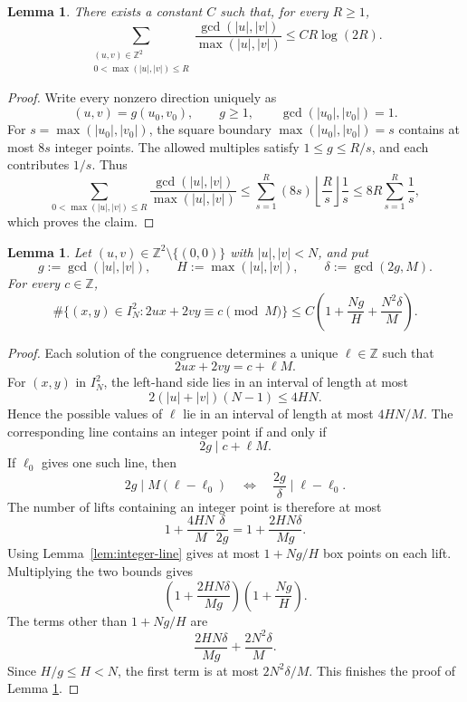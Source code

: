 \documentclass[11pt, twoside]{article}
\numberwithin{equation}{section}
\newtheorem{lemma}[theorem]{Lemma}
\theoremstyle{definition}
\newcommand{\Z}{\mathbb Z}
\begin{document}
\begin{lemma}\label{lem:primitive-sum}
There exists a constant $C$ such that, for every $R\geq1$,
$$
\sum_{\substack{(u,v)\in\Z^2\\0<\max(|u|,|v|)\leq R}}
\frac{\gcd(|u|,|v|)}{\max(|u|,|v|)}\leq CR\log(2R).
$$
\end{lemma}

\begin{proof}
Write every nonzero direction uniquely as
$$
(u,v)=g(u_0,v_0),\qquad g\geq1,\qquad\gcd(|u_0|,|v_0|)=1.
$$
For $s=\max(|u_0|,|v_0|)$, the square boundary
$\max(|u_0|,|v_0|)=s$ contains at most $8s$ integer points.
The allowed multiples satisfy $1\leq g\leq R/s$, and each contributes $1/s$.
Thus
$$
\sum_{0<\max(|u|,|v|)\leq R}\frac{\gcd(|u|,|v|)}{\max(|u|,|v|)}
\leq\sum_{s=1}^{R}(8s)\left\lfloor\frac Rs\right\rfloor\frac1s
\leq 8R\sum_{s=1}^{R}\frac1s,
$$
which proves the claim.
\end{proof}

\begin{lemma}\label{lem:modular-line}
Let $(u,v)\in\Z^2\setminus\{(0,0)\}$ with $|u|,|v|<N$, and put
$$
g:=\gcd(|u|,|v|),\qquad H:=\max(|u|,|v|),\qquad\delta:=\gcd(2g,M).
$$
For every $c\in\Z$,
$$
\#\{(x,y)\in I_N^2:2ux+2vy\equiv c\pmod M\}\leq C\left(1+\frac{Ng}{H}+\frac{N^2\delta}{M}\right).
$$
\end{lemma}

\begin{proof}
Each solution of the congruence determines a unique $\ell\in\Z$ such that
$$
2ux+2vy=c+\ell M.
$$
For $(x,y)$ in $I_N^2$, the left-hand side lies in an interval of length at
most
$$
2(|u|+|v|)(N-1)\leq4HN.
$$
Hence the possible values of $\ell$ lie in an interval of length at most
$4HN/M$.  The corresponding line contains an integer point if and only if
$$
2g\mid c+\ell M.
$$
If $\ell_0$ gives one such line, then
$$
2g\mid M(\ell-\ell_0)
\quad\Longleftrightarrow\quad
\frac{2g}{\delta}\mid\ell-\ell_0.
$$
The number of lifts containing an integer point is therefore at most
$$
1+\frac{4HN}{M}\frac{\delta}{2g}
=1+\frac{2HN\delta}{Mg}.
$$
Using Lemma~\ref{lem:integer-line} gives at most $1+Ng/H$
box points on each lift.  Multiplying the two bounds gives
$$
\left(1+\frac{2HN\delta}{Mg}\right)
\left(1+\frac{Ng}{H}\right).
$$
The terms other than $1+Ng/H$ are
$$
\frac{2HN\delta}{Mg}+\frac{2N^2\delta}{M}.
$$
Since $H/g\leq H<N$, the first term is at most $2N^2\delta/M$.
This finishes the proof of Lemma \ref{lem:modular-line}. 
\end{proof}
\end{document}
